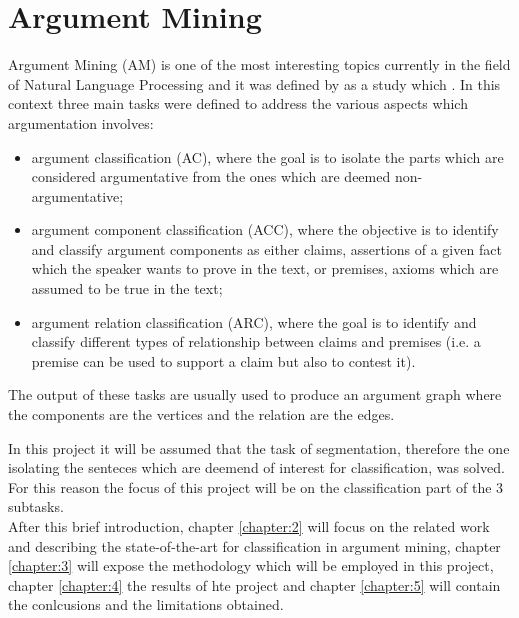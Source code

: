 \section{Argument Mining}\label{sec:am}
Argument Mining (AM) is one of the most interesting topics currently in the field of Natural Language Processing and it was 
defined by \textcite{palau}
as a study which . In this context three main 
tasks were defined to address the various aspects which argumentation involves:
\begin{itemize}
    \item argument classification (AC), where the goal is to isolate the parts which are considered argumentative from the ones which are deemed non-argumentative;
    \item argument component classification (ACC), where the objective is to identify and classify argument components as either claims, assertions of a given fact which the speaker wants to prove in the text, or premises, 
    axioms which are assumed to be true in the text;
    \item argument relation classification (ARC), where the goal is to identify and classify different types of relationship between claims and premises (i.e. a premise can be used to support a claim but also to contest it).
\end{itemize}
The output of these tasks are usually used to produce an argument graph where the components are the vertices and the relation are the edges.


In this project it will be assumed that the task of segmentation, therefore the one isolating the senteces which are deemend of interest for classification,
was solved. For this reason the focus of this project will be on the classification part of the 3 subtasks.\\
After this brief introduction, chapter \ref{chapter:2} will focus on the related work and describing the state-of-the-art for classification in argument mining, chapter \ref{chapter:3}
will expose the methodology which will be employed in this project, chapter \ref{chapter:4} the results of hte project and chapter \ref{chapter:5} will contain the conlcusions and the 
limitations obtained.